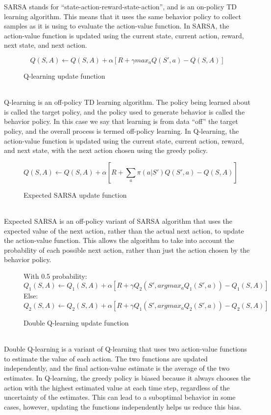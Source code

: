 SARSA stands for ``state-action-reward-state-action'', and is an on-policy TD learning algorithm. This means that it uses the same behavior policy to collect samples as it is using to evaluate the action-value function. In SARSA, the action-value function is updated using the current state, current action, reward, next state, and next action.
\begin{figure}[h]
    \centering
    $$Q(S,A) \leftarrow Q(S,A) + \alpha [R + \gamma {max}_a Q(S',a) - Q(S,A)]$$
    \caption{Q-learning update function}
    \label{algo:QL}
\end{figure}
\\
Q-learning is an off-policy TD learning algorithm. The policy being learned about is called the target policy, and the policy used to generate behavior is called the
behavior policy. In this case we say that learning is from data ``off'' the target policy, and
the overall process is termed off-policy learning. In Q-learning, the action-value function is updated using the current state, current action, reward, and next state, with the next action chosen using the greedy policy.
\begin{figure}[h]
    \centering
    $$Q(S,A) \leftarrow Q(S,A) + \alpha [R + \sum_a \pi (a|S') Q(S',a) - Q(S,A)]$$
    \caption{Expected SARSA update function}
    \label{algo:ES}
\end{figure}
\\
Expected SARSA is an off-policy variant of SARSA algorithm that uses the expected value of the next action, rather than the actual next action, to update the action-value function. This allows the algorithm to take into account the probability of each possible next action, rather than just the action chosen by the behavior policy.
\begin{figure}[h]
    With 0.5 probability:
    $$Q_1(S,A) \leftarrow Q_1(S,A) + \alpha [R + \gamma  Q_2(S', argmax_a Q_1(S',a)) - Q_1(S,A)]$$
    	Else:
    	$$Q_2(S,A) \leftarrow Q_2(S,A) + \alpha [R + \gamma Q_1(S', argmax_a Q_2(S',a)) - Q_2(S,A)]$$
    \caption{Double Q-learning update function}
    \label{algo:DQL}
\end{figure}
\\
Double Q-learning is a variant of Q-learning that uses two action-value functions to estimate the value of each action. The two functions are updated independently, and the final action-value estimate is the average of the two estimates. In Q-learning, the greedy policy is biased because it always chooses the action with the highest estimated value at each time step, regardless of the uncertainty of the estimates. This can lead to a suboptimal behavior in some cases, however, updating the functions independently helps us reduce this bias.